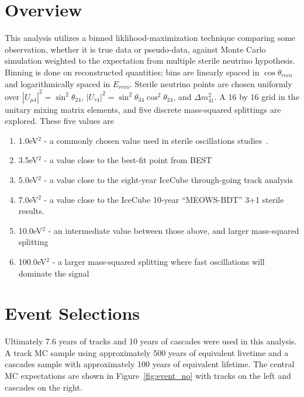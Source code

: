 \documentclass[main.tex]{subfiles}
\begin{document}
\section{Overview}

This analysis utilizes a binned liklihood-maximization technique comparing some observation, whether it is true data or pseudo-data, against Monte Carlo simulation weighted to the expectation from multiple sterile neutrino hypothesis. 
Binning is done on reconstructed quantities; bins are linearly spaced in $\cos\theta_{reco}$ and logarithmically spaced in $E_{reco}$. 
Sterile neutrino points are chosen uniformly over $\left|U_{\mu 4}\right|^{2}=\sin^{2}\theta_{24}$, $\left|U_{\tau 4}\right|^{2}=\sin^{2}\theta_{34}\cos^{2}\theta_{24}$, and $\Delta m_{41}^{2}$. 
A 16 by 16 grid in the unitary mixing matrix elements, and five discrete mass-squared splittings are explored. 
These five values are 
\begin{enumerate}
    \item 1.0eV$^{2}$ - a commonly chosen value used in sterile oscillations studies~\cite{Aartsen_2017_dc, PhysRevD.91.052019, PhysRevD.105.052001}. 
    \item 3.5eV$^{2}$ - a value close to the best-fit point from BEST~\cite{barinov2021results}
    \item 5.0eV$^{2}$ - a value close to the eight-year IceCube through-going track analysis~\cite{Aartsen_2020, Aartsen_2020_prd}
    \item 7.0eV$^{2}$ - a value close to the IceCube 10-year ``MEOWS-BDT'' 3+1 sterile results. 
    \item 10.0eV$^{2}$ - an intermediate value between those above, and larger mass-squared splitting
    \item 100.0eV$^{2}$ - a larger mass-squared splitting where fast oscillations will dominate the signal
\end{enumerate}

\section{Event Selections}

Ultimately 7.6 years of tracks and 10 years of cascades were used in this analysis. 
A track MC sample using approximately 500 years of equivalent livetime and a cascades sample with approximately 100 years of equivalent lifetime. 
The central MC expectations are shown in Figure~\ref{fig:event_no} with tracks on the left and cascades on the right. 
\end{document}
